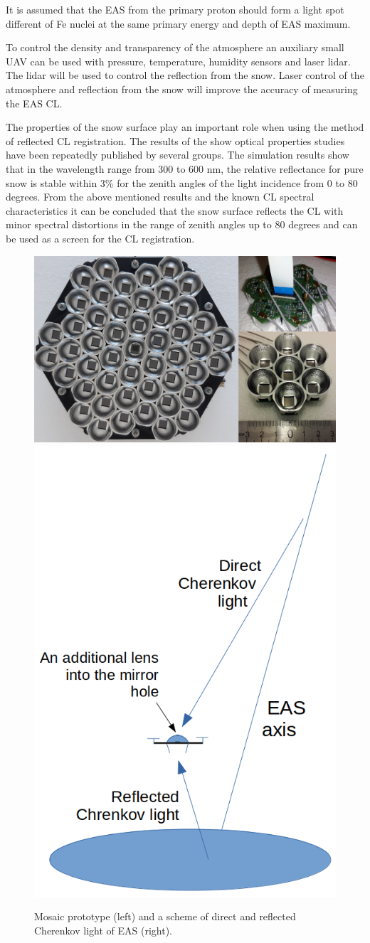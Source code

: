 \documentclass[a4paper,11pt]{article}
\begin{document}
It is assumed that the EAS from the primary proton should form a light spot different of Fe nuclei at the same primary energy and depth of EAS maximum.

To control the density and transparency of the atmosphere an auxiliary small UAV can be used with pressure, temperature, humidity sensors and laser lidar. The lidar will be used to control the reflection from the snow. Laser control of the atmosphere and reflection from the snow will improve the accuracy of measuring the EAS CL.

The properties of the snow surface play an important role when using the method of reflected CL registration. The results of the show optical properties studies have been repeatedly published by several groups. The simulation results show that in the wavelength range from 300 to 600 nm, the relative reflectance for pure snow is stable within 3\% for the zenith angles of the light incidence from 0 to 80 degrees. From the above mentioned results and the known CL spectral characteristics it can be concluded that the snow surface reflects the CL with minor spectral distortions in the range of zenith angles up to 80 degrees and can be used as a screen for the CL registration.


\begin{figure}[htbp]
\centering %
\includegraphics[width=.55\textwidth,trim=0 0 0 0,clip]{mosaic_protype.png}
\qquad
\includegraphics[width=.25\textwidth,origin=c,angle=0]{DirectCL.png}
\caption{\label{fig:3} Mosaic prototype (left) and a scheme of direct and reflected Cherenkov light of EAS (right).}
\end{figure}
\end{document}
